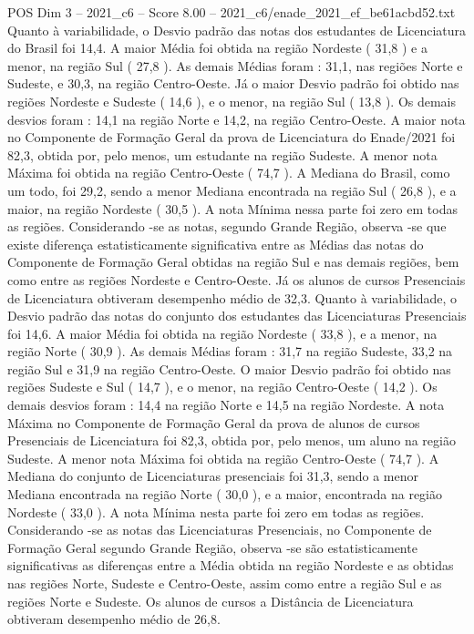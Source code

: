 \begin{textsample}{POS Dim 3 – 2021\_c6 – Score 8.00 – 2021\_c6/enade\_2021\_ef\_be61acbd52.txt}
Quanto à variabilidade, o Desvio padrão das notas dos estudantes de Licenciatura do Brasil foi 14,4.
A maior Média foi obtida na região Nordeste ( 31,8 ) e a menor, na região Sul ( 27,8 ).
As demais Médias foram : 31,1, nas regiões Norte e Sudeste, e 30,3, na região Centro-Oeste.
Já o maior Desvio padrão foi obtido nas regiões Nordeste e Sudeste ( 14,6 ), e o menor, na região Sul ( 13,8 ).
Os demais desvios foram : 14,1 na região Norte e 14,2, na região Centro-Oeste.
A maior nota no Componente de Formação Geral da prova de Licenciatura do Enade/2021 foi 82,3, obtida por, pelo menos, um estudante na região Sudeste.
A menor nota Máxima foi obtida na região Centro-Oeste ( 74,7 ).
A Mediana do Brasil, como um todo, foi 29,2, sendo a menor Mediana encontrada na região Sul ( 26,8 ), e a maior, na região Nordeste ( 30,5 ).
A nota Mínima nessa parte foi zero em todas as regiões.
Considerando -se as notas, segundo Grande Região, observa -se que existe diferença estatisticamente significativa entre as Médias das notas do Componente de Formação Geral obtidas na região Sul e nas demais regiões, bem como entre as regiões Nordeste e Centro-Oeste.
Já os alunos de cursos Presenciais de Licenciatura obtiveram desempenho médio de 32,3.
Quanto à variabilidade, o Desvio padrão das notas do conjunto dos estudantes das Licenciaturas Presenciais foi 14,6.
A maior Média foi obtida na região Nordeste ( 33,8 ), e a menor, na região Norte ( 30,9 ).
As demais Médias foram : 31,7 na região Sudeste, 33,2 na região Sul e 31,9 na região Centro-Oeste.
O maior Desvio padrão foi obtido nas regiões Sudeste e Sul ( 14,7 ), e o menor, na região Centro-Oeste ( 14,2 ).
Os demais desvios foram : 14,4 na região Norte e 14,5 na região Nordeste.
A nota Máxima no Componente de Formação Geral da prova de alunos de cursos Presenciais de Licenciatura foi 82,3, obtida por, pelo menos, um aluno na região Sudeste.
A menor nota Máxima foi obtida na região Centro-Oeste ( 74,7 ).
A Mediana do conjunto de Licenciaturas presenciais foi 31,3, sendo a menor Mediana encontrada na região Norte ( 30,0 ), e a maior, encontrada na região Nordeste ( 33,0 ).
A nota Mínima nesta parte foi zero em todas as regiões.
Considerando -se as notas das Licenciaturas Presenciais, no Componente de Formação Geral segundo Grande Região, observa -se são estatisticamente significativas as diferenças entre a Média obtida na região Nordeste e as obtidas nas regiões Norte, Sudeste e Centro-Oeste, assim como entre a região Sul e as regiões Norte e Sudeste.
Os alunos de cursos a Distância de Licenciatura obtiveram desempenho médio de 26,8.

\end{textsample}
